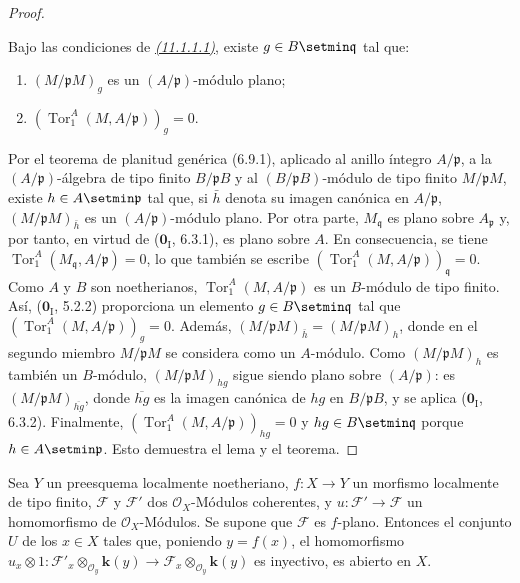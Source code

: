 \begin{proof}
\begin{lemma}[11.1.1.2]
\label{IV.11.1.1.2}
Bajo las condiciones de \emph{{\hyperlink{ega4.c04.sec.11-1-1-1}{(11.1.1.1)}}}, existe $g\in B\setmin\mathfrak q$ tal que:
\begin{enumerate}[label=\textup{(\roman*)}]
  \item $(M/\mathfrak pM)_g$ es un $(A/\mathfrak p)$-módulo plano;
  \item $(\operatorname{Tor}_1^A(M,A/\mathfrak p))_g=0$.
\end{enumerate}
\end{lemma}


Por el teorema de planitud genérica (6.9.1), aplicado al anillo íntegro
$A/\mathfrak p$, a la
$(A/\mathfrak p)$-álgebra de tipo finito
$B/\mathfrak pB$ y al
$(B/\mathfrak pB)$-módulo de tipo finito
$M/\mathfrak pM$, existe
$h\in A\setmin\mathfrak p$ tal que, si $\bar h$ denota su imagen canónica
en $A/\mathfrak p$,
$(M/\mathfrak pM)_{\bar h}$ es un
$(A/\mathfrak p)$-módulo plano. Por otra parte,
$M_{\mathfrak q}$ es plano sobre $A_{\mathfrak p}$ y,
por tanto, en virtud de ($\mathbf 0_{\mathrm I}$, 6.3.1), es plano sobre $A$.
En consecuencia,
se tiene $\operatorname{Tor}_1^A(M_{\mathfrak q},A/\mathfrak p)=0$, lo que también
se escribe $(\operatorname{Tor}_1^A(M,A/\mathfrak p))_{\mathfrak q}=0$.
Como $A$ y $B$ son noetherianos,
$\operatorname{Tor}_1^A(M,A/\mathfrak p)$ es un $B$-módulo de tipo finito.
Así, ($\mathbf 0_{\mathrm I}$, 5.2.2) proporciona un elemento
$g\in B\setmin\mathfrak q$ tal que
$(\operatorname{Tor}_1^A(M,A/\mathfrak p))_g=0$.
Además,
$(M/\mathfrak pM)_{\bar h}=(M/\mathfrak pM)_h$, donde en el segundo miembro $M/\mathfrak pM$ se considera como un $A$-módulo. Como
$(M/\mathfrak pM)_h$ es también un $B$-módulo,
$(M/\mathfrak pM)_{hg}$ sigue siendo plano sobre
$(A/\mathfrak p)$: es
$(M/\mathfrak pM)_{\overline{hg}}$, donde
$\overline{hg}$ es la imagen canónica de $hg$ en
$B/\mathfrak pB$, y se aplica
($\mathbf 0_{\mathrm I}$, 6.3.2). Finalmente,
$(\operatorname{Tor}_1^A(M,A/\mathfrak p))_{hg}=0$
y $hg\in B\setmin\mathfrak q$ porque
$h\in A\setmin\mathfrak p$. Esto demuestra el lema y el teorema.
\end{proof}

\begin{corollary}[11.1.2]
\label{IV.11.1.2}
Sea $Y$ un preesquema localmente noetheriano, $f:X\to Y$ un morfismo localmente de tipo finito, $\mathcal F$ y $\mathcal F'$ dos $\mathcal O_X$-Módulos coherentes, y $u:\mathcal F'\to\mathcal F$ un homomorfismo de $\mathcal O_X$-Módulos. Se supone que $\mathcal F$ es $f$-plano. Entonces el conjunto $U$ de los $x\in X$ tales que, poniendo $y=f(x)$, el homomorfismo $u_x\otimes1:\mathcal F'_x\otimes_{\mathcal O_y}\boldsymbol{k}(y)\longrightarrow
  \mathcal F_x\otimes_{\mathcal O_y}\boldsymbol{k}(y)$ es inyectivo, es abierto en $X$.
\end{corollary}

